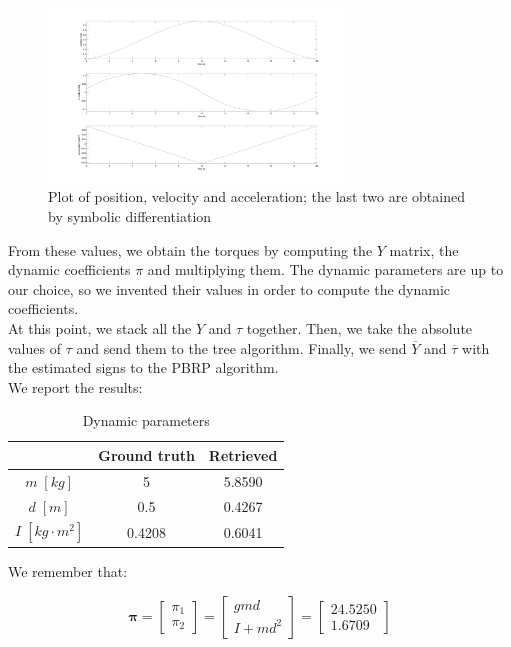 \documentclass{article}
\begin{document}
\begin{figure}[!htbp]
\centering
\includegraphics[width=0.7\textwidth]{images/1-dof/trajectory_easy1.png}
\caption{Plot of position, velocity and acceleration; the last two are obtained by symbolic differentiation}
\end{figure}
\FloatBarrier

From these values, we obtain the torques by computing the $Y$ matrix, the dynamic coefficients $\pi$ and multiplying them. The dynamic parameters are up to our choice, so we invented their values in order to compute the dynamic coefficients. \\

At this point, we stack all the $Y$ and $\tau$ together. Then, we take the absolute values of $\tau$ and send them to the tree algorithm. Finally, we send $\overline{Y}$ and $\overline{\tau}$ with the estimated signs to the PBRP algorithm. \\

We report the results:

\begin{table}[!htbp]
\centering
\begin{tabular}{|c|cc|}
\hline
& Ground truth & Retrieved\\
\hline
$m\;[kg]$ & 5 & 5.8590\\ 
$d\;[m]$ & 0.5 & 0.4267\\
$I\;[kg\cdot m^2]$ & 0.4208 & 0.6041\\
\hline
\end{tabular}
\caption{Dynamic parameters}
\end{table}
\FloatBarrier

We remember that:

\[\bm{\pi}= \begin{bmatrix}
\pi_1 \\ \pi_2
\end{bmatrix} = \begin{bmatrix}
gmd \\ I +md^2
\end{bmatrix}= \begin{bmatrix}
24.5250 \\ 1.6709
\end{bmatrix}\]
\end{document}

